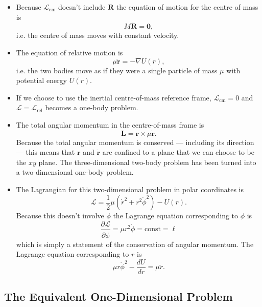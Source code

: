 \documentclass{article}
\renewcommand{\vec}[1]{\boldsymbol{\mathbf{#1}}}
\newcommand{\dvec}[1]{\dot{\vec{#1}}}
\newcommand{\ddvec}[1]{\ddot{\vec{#1}}}
\begin{document}
\begin{itemize}
  \item Because $\mathcal{L}_\text{cm}$ doesn't include $\vec{R}$ the equation of motion for the centre of mass is \[M \ddvec{R} = \vec{0},\] i.e. the centre of mass moves with constant velocity.

  \item The equation of relative motion is \[\mu \ddvec{r} = -\nabla U(r),\] i.e. the two bodies move as if they were a single particle of mass $\mu$ with potential energy $U(r)$.

  \item If we choose to use the inertial centre-of-mass reference frame, $\mathcal{L}_\text{cm} = 0$ and $\mathcal{L} = \mathcal{L}_\text{rel}$ becomes a one-body problem.

  \item The total angular momentum in the centre-of-mass frame is \[\vec{L} = \vec{r} \times \mu \dvec{r}.\] Because the total angular momentum is conserved — including its direction — this means that $\vec{r}$ and $\dvec{r}$ are confined to a plane that we can choose to be the $xy$ plane. The three-dimensional two-body problem has been turned into a two-dimensional one-body problem.

  \item The Lagrangian for this two-dimensional problem in polar coordinates is \[\mathcal{L} = \frac{1}{2} \mu (\dot{r}^2 + r^2 \dot{\phi}^2) - U(r).\] Because this doesn't involve $\phi$ the Lagrange equation corresponding to $\phi$ is \[\frac{\partial \mathcal{L}}{\partial \dot{\phi}} = \mu r^2 \dot{\phi} = \text{const} = \ell\] which is simply a statement of the conservation of angular momentum. The Lagrange equation corresponding to $r$ is \[\mu r \dot{\phi}^2 - \frac{d U}{d r} = \mu \ddot{r}.\]
\end{itemize}

\subsection{The Equivalent One-Dimensional Problem}
\end{document}
